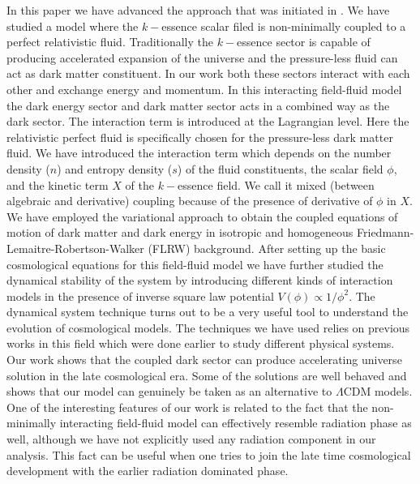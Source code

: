 \documentclass[a4paper,12pt]{article}
\begin{document}
In this paper we have advanced the approach that was initiated in \cite{Boehmer:2015kta}. We have studied a model where the $k-$essence scalar filed is non-minimally coupled to a perfect relativistic fluid. Traditionally the $k-$essence sector is capable of producing accelerated expansion of the universe and the pressure-less fluid can act as dark matter constituent. In our work both these sectors interact with each other and exchange energy and momentum. In this interacting field-fluid model the dark energy sector and dark matter sector acts in a combined way as the dark sector. The interaction term is introduced at the Lagrangian level. Here the relativistic perfect fluid is specifically chosen for the pressure-less dark matter fluid. We have introduced the interaction term which depends on the number density ($n$) and entropy density ($s$) of the fluid constituents, the scalar field $\phi$, and the kinetic term $X$ of the $k-$essence field.  We call it mixed (between algebraic and derivative) coupling because of the presence of derivative of $\phi$ in $X$. We have employed the variational approach to obtain the coupled equations of motion of dark matter and dark energy in isotropic and homogeneous Friedmann-Lemaitre-Robertson-Walker (FLRW) background.  After setting up the basic cosmological equations for this field-fluid model we have further studied the dynamical stability of the system by introducing different kinds of interaction models in the presence of inverse square law potential $V(\phi) \propto {1}/{\phi^2} $\cite{Yang:2010vv}. The dynamical system technique turns out to be a very useful tool to understand the evolution of cosmological models. The techniques we have used relies on previous works in this field \cite{Boehmer:2015sha,Pal:2019tkc,Chakraborty:2019swx,Roy:2017uvr,DeSantiago:2012nk,Dutta:2016bbs,Ng:2001hs,Koivisto:2009fb,Bahamonde:2017ize,Tamanini:2014mpa,Dutta:2017wfd} which were done earlier to study different physical systems. Our work shows that the coupled dark sector can produce accelerating universe solution in the late cosmological era. Some of the solutions are well behaved and shows that our model can genuinely be taken as an alternative to $\Lambda$CDM models. One of the interesting features of our work is related to the fact that the non-minimally interacting field-fluid model can effectively resemble radiation phase as well, although we have not explicitly used any radiation component in our analysis. This fact can be useful when one tries to join the late time cosmological development with the earlier radiation dominated phase.
\end{document}
